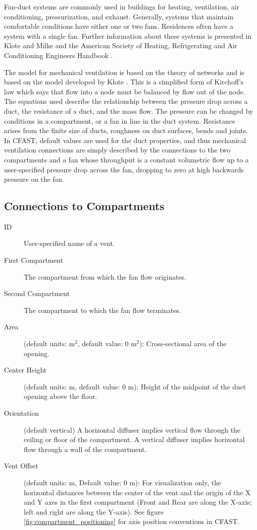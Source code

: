 Fan-duct systems are commonly used in buildings for heating, ventilation, air conditioning, pressurization, and exhaust. Generally, systems that maintain comfortable conditions have either one or two fans.  Residences often have a system with a single fan. Further information about these systems is presented in  Klote and Milke \cite{Klote:2002} and the American Society of Heating, Refrigerating and Air Conditioning Engineers Handbook \cite{ASHRAE:2001}.

The model for mechanical ventilation is based on the theory of networks and is based on the model developed by Klote \cite{Klote:1988a}.  This is a simplified form of Kirchoff's law which says that flow into a node must be balanced by flow out of the node. The equations used describe the relationship between the pressure drop across a duct, the resistance of a duct, and the mass flow.  The pressure can be changed by conditions in a compartment, or a fan in line in the duct system.  Resistance arises from the finite size of ducts, roughness on duct surfaces, bends and joints. In CFAST, default values are used for the duct properties, and thus mechanical ventilation connections are simply described by the connections to the two compartments and a fan whose throughput is a constant volumetric flow up to a user-specified pressure drop across the fan, dropping to zero at high backwards pressure on the fan.

\subsection{Connections to Compartments}
\label{info:VENT3}
\begin{description}
\item[ID] User-specified name of a vent.
\item[First Compartment] The compartment from which the fan flow originates.
\item[Second Compartment] The compartment to which the fan flow terminates.
\item[Area] (default units: m$^2$, default value: 0 m$^2$): Cross-sectional area of the opening.
\label{Mech Height}
\item[Center Height] (default units: m, default value: 0 m): Height of the midpoint of the duct opening above the floor.
\item[Orientation] (default vertical) A horizontal diffuser implies vertical flow through the ceiling or floor of the compartment.  A vertical diffuser implies horizontal flow through a wall of the compartment.
\item[Vent Offset] (default units: m, Default value: 0 m): For visualization only, the horizontal distances between the center of the vent and the origin of the X and Y axes in the first compartment (Front and Rear are along the X-axis; left and right are along the Y-axis). See figure \ref{fig:compartment_positioning} for axis position conventions in CFAST.
\end{description}

